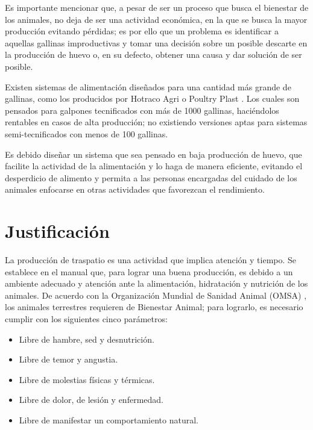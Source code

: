 Es importante mencionar que, a pesar de ser un proceso que busca el bienestar de los animales, no deja de ser una actividad económica, en la que se busca la mayor producción evitando pérdidas; es por ello que un problema es identificar a aquellas gallinas improductivas y tomar una decisión sobre un posible descarte en la producción de huevo o, en su defecto, obtener una causa y dar solución de ser posible.

Existen sistemas de alimentación diseñados para una cantidad más grande de gallinas, como los producidos por Hotraco Agri\cite{b-2024} o Poultry Plast \cite{veterinaria-digital-sa-2021} \cite{unknown-author-2021}. Los cuales son pensados para galpones tecnificados con más de 1000 gallinas, haciéndolos rentables en casos de alta producción; no existiendo versiones aptas para sistemas semi-tecnificados con menos de 100 gallinas.

Es debido diseñar un sistema que sea pensado en baja producción de huevo, que facilite la actividad de la alimentación y lo haga de manera eficiente, evitando el desperdicio de alimento y permita a las personas encargadas del cuidado de los animales enfocarse en otras actividades que favorezcan el rendimiento.

\newpage

\section{Justificación}

La producción de traspatio es una actividad que implica atención y tiempo. Se establece en el manual que, para lograr una buena producción, es debido a un ambiente adecuado y atención ante la alimentación, hidratación y nutrición de los animales. De acuerdo con la Organización Mundial de Sanidad Animal (OMSA) \cite{world-organisation-for-animal-health-2024}, los animales terrestres requieren de Bienestar Animal; para lograrlo, es necesario cumplir con los siguientes cinco parámetros:

\begin{itemize}
    \item Libre de hambre, sed y desnutrición.
    \item Libre de temor y angustia.
    \item Libre de molestias físicas y térmicas.
    \item Libre de dolor, de lesión y enfermedad.
    \item Libre de manifestar un comportamiento natural.
\end{itemize}


